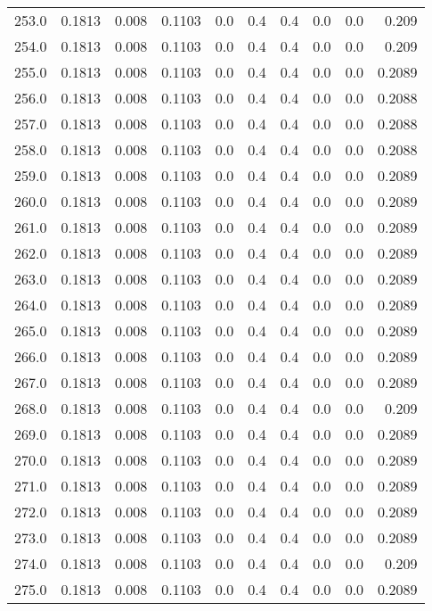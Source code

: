 \begin{longtable}{lrrrrrrrrr}
253.0 & 0.1813 & 0.008 & 0.1103 & 0.0 & 0.4 & 0.4 & 0.0 & 0.0 & 0.209 \\
254.0 & 0.1813 & 0.008 & 0.1103 & 0.0 & 0.4 & 0.4 & 0.0 & 0.0 & 0.209 \\
255.0 & 0.1813 & 0.008 & 0.1103 & 0.0 & 0.4 & 0.4 & 0.0 & 0.0 & 0.2089 \\
256.0 & 0.1813 & 0.008 & 0.1103 & 0.0 & 0.4 & 0.4 & 0.0 & 0.0 & 0.2088 \\
257.0 & 0.1813 & 0.008 & 0.1103 & 0.0 & 0.4 & 0.4 & 0.0 & 0.0 & 0.2088 \\
258.0 & 0.1813 & 0.008 & 0.1103 & 0.0 & 0.4 & 0.4 & 0.0 & 0.0 & 0.2088 \\
259.0 & 0.1813 & 0.008 & 0.1103 & 0.0 & 0.4 & 0.4 & 0.0 & 0.0 & 0.2089 \\
260.0 & 0.1813 & 0.008 & 0.1103 & 0.0 & 0.4 & 0.4 & 0.0 & 0.0 & 0.2089 \\
261.0 & 0.1813 & 0.008 & 0.1103 & 0.0 & 0.4 & 0.4 & 0.0 & 0.0 & 0.2089 \\
262.0 & 0.1813 & 0.008 & 0.1103 & 0.0 & 0.4 & 0.4 & 0.0 & 0.0 & 0.2089 \\
263.0 & 0.1813 & 0.008 & 0.1103 & 0.0 & 0.4 & 0.4 & 0.0 & 0.0 & 0.2089 \\
264.0 & 0.1813 & 0.008 & 0.1103 & 0.0 & 0.4 & 0.4 & 0.0 & 0.0 & 0.2089 \\
265.0 & 0.1813 & 0.008 & 0.1103 & 0.0 & 0.4 & 0.4 & 0.0 & 0.0 & 0.2089 \\
266.0 & 0.1813 & 0.008 & 0.1103 & 0.0 & 0.4 & 0.4 & 0.0 & 0.0 & 0.2089 \\
267.0 & 0.1813 & 0.008 & 0.1103 & 0.0 & 0.4 & 0.4 & 0.0 & 0.0 & 0.2089 \\
268.0 & 0.1813 & 0.008 & 0.1103 & 0.0 & 0.4 & 0.4 & 0.0 & 0.0 & 0.209 \\
269.0 & 0.1813 & 0.008 & 0.1103 & 0.0 & 0.4 & 0.4 & 0.0 & 0.0 & 0.2089 \\
270.0 & 0.1813 & 0.008 & 0.1103 & 0.0 & 0.4 & 0.4 & 0.0 & 0.0 & 0.2089 \\
271.0 & 0.1813 & 0.008 & 0.1103 & 0.0 & 0.4 & 0.4 & 0.0 & 0.0 & 0.2089 \\
272.0 & 0.1813 & 0.008 & 0.1103 & 0.0 & 0.4 & 0.4 & 0.0 & 0.0 & 0.2089 \\
273.0 & 0.1813 & 0.008 & 0.1103 & 0.0 & 0.4 & 0.4 & 0.0 & 0.0 & 0.2089 \\
274.0 & 0.1813 & 0.008 & 0.1103 & 0.0 & 0.4 & 0.4 & 0.0 & 0.0 & 0.209 \\
275.0 & 0.1813 & 0.008 & 0.1103 & 0.0 & 0.4 & 0.4 & 0.0 & 0.0 & 0.2089 \\

\end{longtable}
